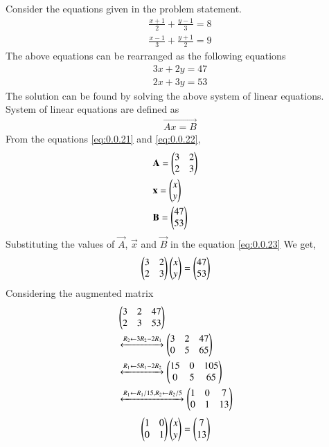 \documentclass[journal,12pt,twocolumn]{IEEEtran}
\begin{document}
\begin{enumerate}
\solution Consider the equations given in the problem statement.
\begin{align}
\displaystyle\frac{x+1}{2}+\displaystyle\frac{y-1}{3}=8\\
\displaystyle\frac{x-1}{3}+\displaystyle\frac{y+1}{2}=9
\end{align}
The above equations can be rearranged as the following equations
\begin{align}
3x+2y=47 \label{eq:0.0.21}\\
2x+3y=53 \label{eq:0.0.22}
\end{align}
The solution can be found by solving the above system of linear equations.\\ 
System of linear equations are defined as 
\begin{align}
\vec{Ax=B} \label{eq:0.0.23}
\end{align}
From the equations \eqref{eq:0.0.21} and \eqref{eq:0.0.22}, 
\begin{align}
&\vec{A}= \myvec{3 &2\\2 & 3}&\\
\medskip
&\vec{x}= \myvec{ x\\ y}&\\
\medskip
&\vec{B}= \myvec{47\\53}&  
\end{align} 
Substituting the values of $\vec{A}$, $\vec{x}$ and $\vec{B}$ in the equation \eqref{eq:0.0.23}
We get,
\begin{align}
&\begin{pmatrix}3&2\\2&3\end{pmatrix} \begin{pmatrix}x\\y\end{pmatrix}= \begin{pmatrix}47\\53\end{pmatrix}&
\end{align}
Considering the augmented matrix 
 \begin{align}
& \begin{pmatrix}3&2&47\\2&3&53\end{pmatrix}&
 \\
&\xleftrightarrow[]{ R_2 \leftarrow 3R_2 - 2R_1}
 \begin{pmatrix}3&2&47\\0&5&65\end{pmatrix}&\\
 &\xleftrightarrow[]{ R_1 \leftarrow 5R_1 - 2R_2}
 \begin{pmatrix}15&0&105\\0&5&65\end{pmatrix}&\\
 &\xleftrightarrow[]{ R_1 \leftarrow R_1/15,R_2\leftarrow R_2/5}
 \begin{pmatrix}1&0&7\\0&1&13\end{pmatrix}&
 \end{align}
 \begin{align}
&\myvec{1&0\\0&1} \myvec{x\\y}= \myvec{7\\13}& \label{eq:0.0.32}

\end{align}
\end{enumerate}
\end{document}
